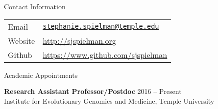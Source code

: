 \documentclass{resume} %
\begin{document}
\vspace*{0.5cm}
\begin{rSection}{Contact Information}
\vspace*{0.25cm}

\begin{table}[H]
	\begin{tabular}{ll}
		Email & \texttt{\href{mailto:stephanie.spielman@temple.edu}{stephanie.spielman@temple.edu}} \\
		Website & \url{http://sjspielman.org} \\
		Github &  \url{https://www.github.com/sjspielman} \\
	\end{tabular}
\end{table}
\end{rSection}
\vspace*{-0.45cm}



\begin{rSection}{Academic Appointments}
\vspace*{0.25cm}

{\bf Research Assistant Professor/Postdoc} \hfill {2016 -- Present} \\
Institute for Evolutionary Genomics and Medicine, Temple University \\
\end{rSection}

\end{document}
